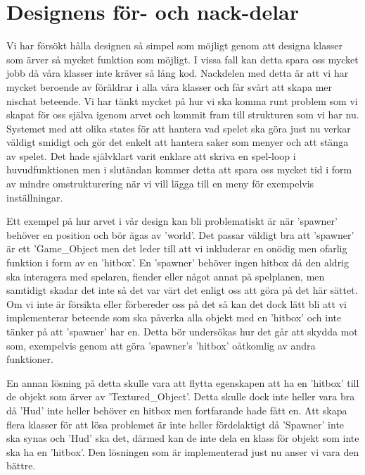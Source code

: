 \documentclass{TDP005mall}
\begin{document}
\section{Designens för- och nack-delar}
Vi har försökt hålla designen så simpel som möjligt genom att designa klasser som ärver så mycket funktion som möjligt. I vissa fall kan detta spara oss mycket jobb då våra klasser inte kräver så lång kod. Nackdelen med detta är att vi har mycket beroende av föräldrar i alla våra klasser och får svårt att skapa mer nischat beteende. Vi har tänkt mycket på hur vi ska komma runt problem som vi skapat för oss själva igenom arvet och kommit fram till strukturen som vi har nu. Systemet med att olika states för att hantera vad spelet ska göra just nu verkar väldigt smidigt och gör det enkelt att hantera saker som menyer och att stänga av spelet. Det hade självklart varit enklare att skriva en spel-loop i huvudfunktionen men i slutändan kommer detta att spara oss mycket tid i form av mindre omstrukturering när vi vill lägga till en meny för exempelvis inställningar.

Ett exempel på hur arvet i vår design kan bli problematiskt är när 'spawner' behöver en position och bör ägas av 'world'. Det passar väldigt bra att 'spawner' är ett 'Game\_Object men det leder till att vi inkluderar en onödig men ofarlig funktion i form av en 'hitbox'. En 'spawner' behöver ingen hitbox då den aldrig ska interagera med spelaren, fiender eller något annat på spelplanen, men samtidigt skadar det inte så det var värt det enligt oss att göra på det här sättet. Om vi inte är försikta eller förbereder oss på det så kan det dock lätt bli att vi implementerar beteende som ska påverka alla objekt med en 'hitbox' och inte tänker på att 'spawner' har en. Detta bör undersökas hur det går att skydda mot som, exempelvis genom att göra 'spawner's 'hitbox' oåtkomlig av andra funktioner.

En annan lösning på detta skulle vara att flytta egenskapen att ha en 'hitbox' till de objekt som ärver av 'Textured\_Object'. Detta skulle dock inte heller vara bra då 'Hud' inte heller behöver en hitbox men fortfarande hade fått en. Att skapa flera klasser för att lösa problemet är inte heller fördelaktigt då 'Spawner' inte ska synas och 'Hud' ska det, därmed kan de inte dela en klass för objekt som inte ska ha en 'hitbox'. Den lösningen som är implementerad just nu anser vi vara den bättre.
\end{document}
